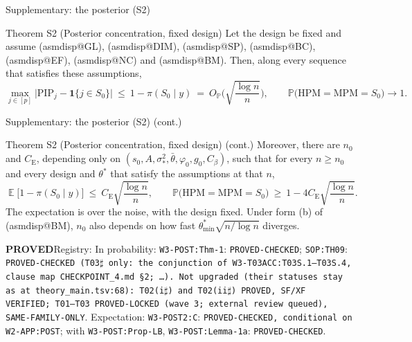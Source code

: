 \documentclass[aspectratio=169]{beamer}
\makeatletter
\newcommand{\asmdisp}[1]{\csname asmdisp@#1\endcsname}
\newcommand{\as}[1]{\textup{(\asmdisp{#1})}}
\newcommand{\ind}[1]{\mathbf{1}\{#1\}}
\newcommand{\set}[1]{[#1]}
\DeclareMathOperator{\E}{\mathbb{E}}
\renewcommand{\P}{\mathbb{P}}
\newcommand{\OP}{O_{\P}}
\newcommand{\sigs}{\sigma_*}
\newcommand{\tstar}{\theta^*}
\newcommand{\tmin}{\theta^*_{\min}}
\newcommand{\Sz}{S_0}
\newcommand{\sz}{s_0}
\newcommand{\pis}[1]{\pi(#1\mid y)}
\newcommand{\PIP}{\mathrm{PIP}}
\newcommand{\HPM}{\mathrm{HPM}}
\newcommand{\MPM}{\mathrm{MPM}}
\newcommand{\rid}[1]{\texttt{#1}}
\makeatother
\begin{document}
\begin{frame}{Supplementary: the posterior (S2)}
\footnotesize
\begin{block}{Theorem S2 (Posterior concentration, fixed design)}
Let the design be fixed and assume \as{GL}, \as{DIM}, \as{SP}, \as{BC}, \as{EF}, \as{NC} and \as{BM}. Then, along every
sequence that satisfies these assumptions,
\begin{equation}\tag{18}
  \max_{j\in\set{p}}\big|\PIP_j-\ind{j\in\Sz}\big|\ \le\ 1-\pis{\Sz}\ =\ \OP\Big(\sqrt{\frac{\log n}{n}}\Big),\qquad
  \P\big(\HPM=\MPM=\Sz\big)\to1 .
\end{equation}
\end{block}
\end{frame}

\begin{frame}{Supplementary: the posterior (S2) (cont.)}
\footnotesize
\begin{block}{Theorem S2 (Posterior concentration, fixed design) (cont.)}
Moreover, there are $n_0$ and $C_{\mathrm E}$, depending only on $(\sz,A,\sigs^2,\bar\theta,\varphi_0,g_0,C_\beta)$, such that for
every $n\ge n_0$ and every design and $\tstar$ that satisfy the assumptions at that $n$,
\begin{equation}\tag{19}
  \E\big[1-\pis{\Sz}\big]\ \le\ C_{\mathrm E}\sqrt{\frac{\log n}{n}},\qquad \P\big(\HPM=\MPM=\Sz\big)\ \ge\ 1-4C_{\mathrm E}\sqrt{\frac{\log n}{n}} .
\end{equation}
The expectation is over the noise, with the design fixed. Under form (b) of \as{BM}, $n_0$ also depends on how fast
$\tmin\sqrt{n/\log n}$ diverges.
\end{block}
{\footnotesize \textbf{PROVED}\quad Registry: In probability: \rid{W3-POST:Thm-1}: \rid{PROVED-CHECKED}; \rid{SOP:TH09}: \rid{PROVED-CHECKED (T03$\sharp$ only: the conjunction of W3-T03ACC:T03S.1--T03S.4, clause map
CHECKPOINT\_4.md \S2; \dots). Not upgraded (their statuses stay as at theory\_main.tsv:68): T02(i$\sharp$) and
T02(ii$\sharp$) PROVED, SF/XF VERIFIED; T01--T03 PROVED-LOCKED (wave 3; external review queued), SAME-FAMILY-ONLY}. Expectation: \rid{W3-POST2:C}: \rid{PROVED-CHECKED, conditional on W2-APP:POST}; with \rid{W3-POST:Prop-LB}, \rid{W3-POST:Lemma-1a\textquotesingle}: \rid{PROVED-CHECKED}.}

\end{frame}
\end{document}
